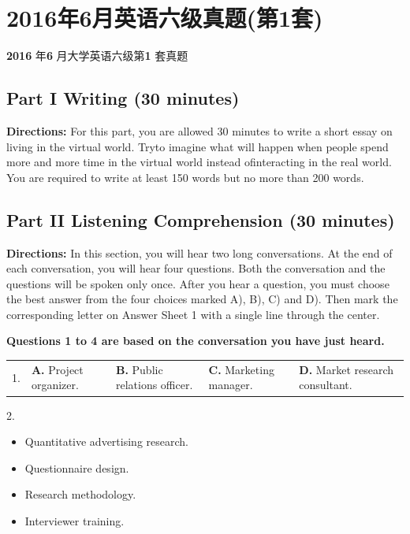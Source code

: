 \documentclass[UTF8,11pt]{ctexart}
\begin{document}
\section*{2016年6月英语六级真题(第1套)}
\textbf{2016} 年\textbf{6} 月大学英语六级第\textbf{1} 套真题


\subsection*{\textbf{Part I} \textbf{Writing} \textbf{(30 minutes)}}


\textbf{Directions:} For this part, you are allowed 30 minutes to write a short essay on living in the virtual world. Tryto imagine what will happen when people spend more and more time in the virtual world instead ofinteracting in the real world. You are required to write at least 150 words but no more than 200 words.


\subsection*{\textbf{Part II} \textbf{Listening Comprehension} \textbf{(30 minutes)}}


\textbf{Directions:} In this section, you will hear two long conversations. At the end of each conversation, you will hear four questions. Both the conversation and the questions will be spoken only once. After you hear a question, you must choose the best answer from the four choices marked A), B), C) and D). Then mark the corresponding letter on Answer Sheet 1 with a single line through the center.


\textbf{Questions 1 to 4 are based on the conversation you have just heard.}


\noindent\begin{tabularx}{\linewidth}{@{}lXXXX@{}}1. & \textbf{A.} Project organizer. & \textbf{B.} Public relations officer. & \textbf{C.} Marketing manager. & \textbf{D.} Market research consultant.\\\end{tabularx}\par

2.


\begin{itemize}[leftmargin=2em,itemsep=.2em,topsep=.4em]\item[A.] Quantitative advertising research.
\item[B.] Questionnaire design.
\item[C.] Research methodology.
\item[D.] Interviewer training.
\end{itemize}
\end{document}
